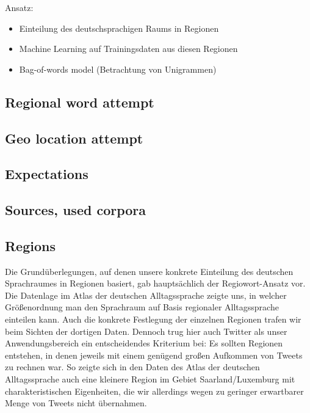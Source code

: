 \documentclass[../Main.tex]{subfiles}
\begin{document}
Ansatz:
\begin{itemize}
\item Einteilung des deutschsprachigen Raums in Regionen
\item Machine Learning auf Trainingsdaten aus diesen Regionen
\item Bag-of-words model (Betrachtung von Unigrammen)
\end{itemize}

\subsection{Regional word attempt}
\subsection{Geo location attempt}
\subsection{Expectations}
\subsection{Sources, used corpora}
\subsection{Regions}
Die Grundüberlegungen, auf denen unsere konkrete Einteilung des deutschen Sprachraumes in Regionen basiert, gab hauptsächlich der Regiowort-Ansatz vor. Die Datenlage im Atlas der deutschen Alltagssprache zeigte uns, in welcher Größenordnung man den Sprachraum auf Basis regionaler Alltagssprache einteilen kann. Auch die konkrete Festlegung der einzelnen Regionen trafen wir beim Sichten der dortigen Daten. Dennoch trug hier auch Twitter als unser Anwendungsbereich ein entscheidendes Kriterium bei: Es sollten Regionen entstehen, in denen jeweils mit einem genügend großen Aufkommen von Tweets zu rechnen war. So zeigte sich in den Daten des Atlas der deutschen Alltagssprache auch eine kleinere Region im Gebiet Saarland/Luxemburg mit charakteristischen Eigenheiten, die wir allerdings wegen zu geringer erwartbarer Menge von Tweets nicht übernahmen.
\end{document}
